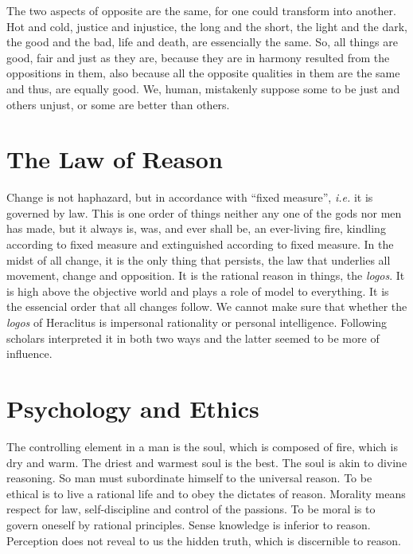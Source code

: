 \documentclass[11pt]{article}
\begin{document}
\begin{sloppypar}
\par

The two aspects of opposite are the same, for one could transform into another. 
Hot and cold, justice and injustice, the long and the short, the light and the dark, the good and the bad, life and death, are essencially the same. 
So, all things are good, fair and just as they are, because they are in harmony resulted from the oppositions in them, also because all the opposite qualities in them are the same and thus, are equally good. 
We, human, mistakenly suppose some to be just and others unjust, or some are better than others. 

\section{The Law of Reason}
Change is not haphazard, but in accordance with “fixed measure”, \textit{i.e.} it is governed by law. 
This is one order of things neither any one of the gods nor men has made, but it always is, was, and ever shall be, an ever-living fire, kindling according to fixed measure and extinguished according to fixed measure. 
In the midst of all change, it is the only thing that persists, the law that underlies all movement, change and opposition. 
It is the rational reason in things, the \textit{logos}. 
It is high above the objective world and plays a role of model to everything. 
It is the essencial order that all changes follow. 
We cannot make sure that whether the \textit{logos} of Heraclitus is impersonal rationality or personal intelligence. 
Following scholars interpreted it in both two ways and the latter seemed to be more of influence. 

\section{Psychology and Ethics}
The controlling element in a man is the soul, which is composed of fire, which is dry and warm. 
The driest and warmest soul is the best. 
The soul is akin to divine reasoning. 
So man must subordinate himself to the universal reason. 
To be ethical is to live a rational life and to obey the dictates of reason. 
Morality means respect for law, self-discipline and control of the passions. 
To be moral is to govern oneself by rational principles. 
Sense knowledge is inferior to reason. 
Perception does not reveal to us the hidden truth, which is discernible to reason.
\end{sloppypar}
\end{document}
